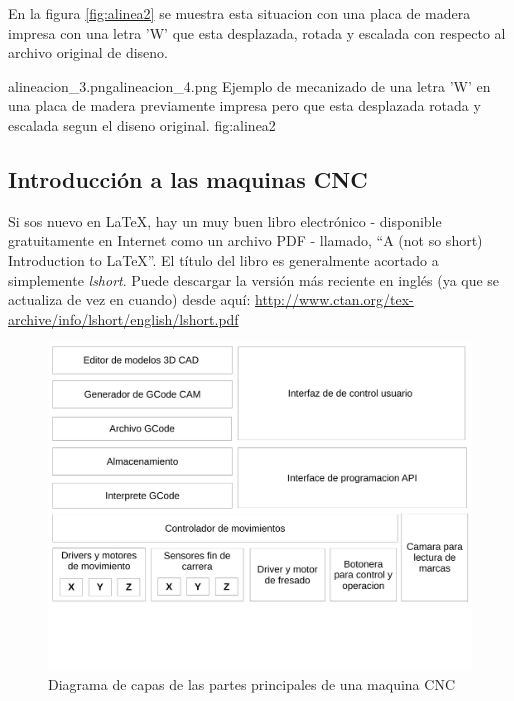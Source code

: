    En la figura \ref{fig:alinea2} se muestra esta situacion con una placa de madera impresa con una letra 'W' que esta desplazada, rotada y escalada con respecto al archivo original de diseno.

            {alineacion_3.png}{alineacion_4.png}
            {Ejemplo de mecanizado de una letra 'W' en una placa de madera previamente impresa pero que esta desplazada rotada y escalada segun el diseno original.}
            {fig:alinea2}



\subsection{Introducción a las maquinas CNC}


Si sos nuevo en \LaTeX{}, hay un muy buen libro electrónico - disponible gratuitamente en Internet como un archivo PDF - llamado, \enquote{A (not so short) Introduction to \LaTeX{}}. El título del libro es generalmente acortado a simplemente \emph{lshort}. Puede descargar la versión más reciente en inglés (ya que se actualiza de vez en cuando) desde aquí:
\url{http://www.ctan.org/tex-archive/info/lshort/english/lshort.pdf}

   \centering
   \begin{figure}[ht]
      \includegraphics[width=\textwidth]{./Figures/draw/cnc_blocks.pdf}
      \caption{Diagrama de capas de las partes principales de una maquina CNC}
      \label{fig:cnc_block1}
   \end{figure}

